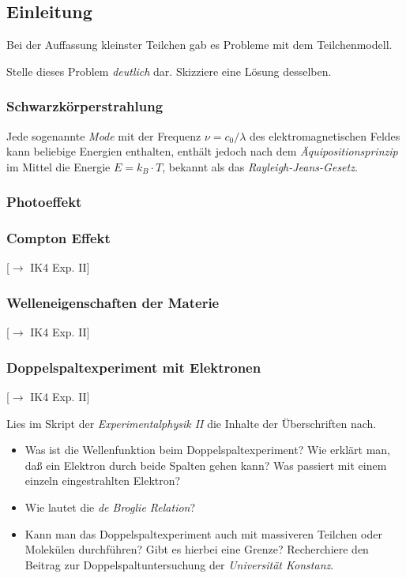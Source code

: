 \documentclass{article}
\begin{document}
    \subsection*{Einleitung}
        Bei der Auffassung kleinster Teilchen gab es Probleme mit dem Teilchenmodell. 
        \begin{Aufgabe}
            \nr{} Stelle dieses Problem \emph{deutlich} dar. Skizziere eine Lösung desselben. 
        \end{Aufgabe}
        \subsubsection*{Schwarzkörperstrahlung}
            Jede sogenannte \emph{Mode} mit der Frequenz $\nu = c_0/\lambda$ des elektromagnetischen Feldes kann beliebige Energien enthalten, enthält jedoch nach dem \emph{Äquipositionsprinzip} im Mittel die Energie $E = k_B\cdot T$, bekannt als das \emph{Rayleigh-Jeans-Gesetz}. 

        \subsubsection*{Photoeffekt}


        \subsubsection*{Compton Effekt}
            [$\to$ IK4 Exp. II] 

        \subsubsection*{Welleneigenschaften der Materie}
            [$\to$ IK4 Exp. II]

        \subsubsection*{Doppelspaltexperiment mit Elektronen}
            [$\to$ IK4 Exp. II]

        
        \begin{Aufgabe}
            \nr{} Lies im Skript der \emph{Experimentalphysik II} die Inhalte der Überschriften nach. 
            \begin{itemize}[label=$\to$]
                \item {}Was ist die Wellenfunktion beim Doppelspaltexperiment? Wie erklärt man, daß ein Elektron durch beide Spalten gehen kann? Was passiert mit einem einzeln eingestrahlten Elektron?
                \item {}Wie lautet die \emph{de Broglie Relation}?
                \item {}Kann man das Doppelspaltexperiment auch mit massiveren Teilchen oder Molekülen durchführen? Gibt es hierbei eine Grenze? Recherchiere den Beitrag zur Doppelspaltuntersuchung der \emph{Universität Konstanz}.
            \end{itemize}
        \end{Aufgabe}
\end{document}
